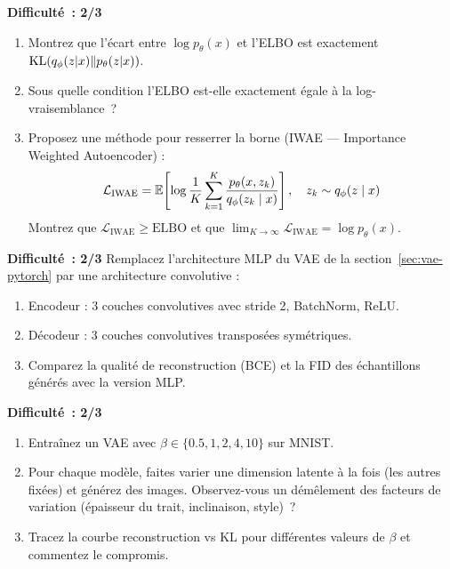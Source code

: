 \begin{exercice}
\label{exo:elbo-tightness}
\textbf{Difficult\'e~: 2/3}
\begin{enumerate}
    \item Montrez que l'\'ecart entre $\log p_\theta(x)$ et l'ELBO est exactement $\mathrm{KL}(q_\phi(z|x) \| p_\theta(z|x))$.
    \item Sous quelle condition l'ELBO est-elle exactement \'egale \`a la log-vraisemblance~?
    \item Proposez une m\'ethode pour resserrer la borne (IWAE --- Importance Weighted Autoencoder) :
    \begin{equation}
    \mathcal{L}_{\text{IWAE}} = \mathbb{E}\!\left[\log \frac{1}{K}\sum_{k=1}^{K} \frac{p_\theta(x, z_k)}{q_\phi(z_k \mid x)}\right], \quad z_k \sim q_\phi(z \mid x)
    \end{equation}
    Montrez que $\mathcal{L}_{\text{IWAE}} \geq \text{ELBO}$ et que $\lim_{K \to \infty} \mathcal{L}_{\text{IWAE}} = \log p_\theta(x)$.
\end{enumerate}
\end{exercice}

\begin{exercice}
\label{exo:conv-vae}
\textbf{Difficult\'e~: 2/3}
Remplacez l'architecture MLP du VAE de la section~\ref{sec:vae-pytorch} par une architecture convolutive :
\begin{enumerate}
    \item Encodeur : 3 couches convolutives avec stride 2, BatchNorm, ReLU.
    \item D\'ecodeur : 3 couches convolutives transpos\'ees sym\'etriques.
    \item Comparez la qualit\'e de reconstruction (BCE) et la FID des \'echantillons g\'en\'er\'es avec la version MLP.
\end{enumerate}
\end{exercice}

\begin{exercice}
\label{exo:beta-vae-exp}
\textbf{Difficult\'e~: 2/3}
\begin{enumerate}
    \item Entra\^inez un VAE avec $\beta \in \{0.5, 1, 2, 4, 10\}$ sur MNIST.
    \item Pour chaque mod\`ele, faites varier une dimension latente \`a la fois (les autres fix\'ees) et g\'en\'erez des images. Observez-vous un d\'em\^element des facteurs de variation (\'epaisseur du trait, inclinaison, style)~?
    \item Tracez la courbe reconstruction vs KL pour diff\'erentes valeurs de $\beta$ et commentez le compromis.
\end{enumerate}
\end{exercice}

